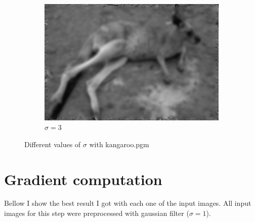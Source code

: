 \documentclass{article}
\begin{document}
\begin{figure}[!h]
\begin{subfigure}{0.3\textwidth}
    \includegraphics[width=\textwidth]{kangsig3}
    \caption{$\sigma = 3$}
    \label{fig:f2}
  \end{subfigure} 
  \caption{Different values of $\sigma$ with kangaroo.pgm}
\end{figure}

\vspace{.1pc}
\section{Gradient computation}

Bellow I show the best result I got with each one of the input images. All input images for this step were preprocessed with gaussian filter ($\sigma = 1$).
\end{document}
